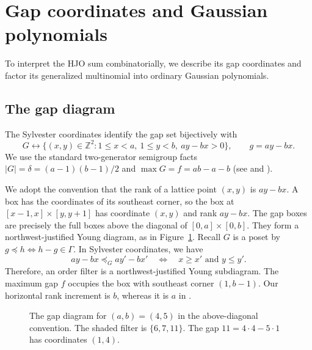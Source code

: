 \documentclass[12pt,reqno]{amsart}
\numberwithin{equation}{section}
\theoremstyle{definition}
\theoremstyle{remark}
\theoremstyle{plain}
\newcommand{\ZZ}{\mathbb Z}
\begin{document}
\section{Gap coordinates and Gaussian polynomials}\label{sec:definitions}

To interpret the HJO sum combinatorially, we describe its gap coordinates
and factor its generalized multinomial into ordinary Gaussian polynomials.



\subsection{The gap diagram}
The Sylvester coordinates identify the gap set bijectively with
\begin{equation}\label{eq:sylvester}
 G\longleftrightarrow
 \{(x,y)\in\ZZ^2:1\le x<a,\ 1\le y<b,\ ay-bx>0\},
 \qquad g=ay-bx.
\end{equation}
We use the standard two-generator semigroup facts
$|G|=\delta=(a-1)(b-1)/2$ and $\max G=f=ab-a-b$ (see \cite[Section~1.2]{Huang} and \cite[Chapter~2]{RA}).

We adopt the convention that the rank of a lattice point $(x,y)$ is $ay-bx$.
A box has the coordinates of its southeast corner, so the box at $[x-1,x]\times[y,y+1]$ has coordinate $(x,y)$ and rank $ay-bx$.
The gap boxes are precisely the full boxes above the diagonal of
$[0,a]\times[0,b]$.  They form a northwest-justified Young diagram, 
as in Figure~\ref{fig:younggap}.
Recall $G$ is a poset by $g\preceq h\iff h-g\in \Gamma$. In Sylvester coordinates, we have
\[
 ay-bx\preceq_G ay'-bx'
       \quad\Longleftrightarrow\quad x\ge x'\text{ and }y\le y'.
\]
Therefore, an order filter is a northwest-justified Young subdiagram.
The maximum gap $f$ occupies the box with southeast corner $(1,b-1)$.
Our horizontal rank increment is $b$, whereas it is $a$ in
\cite[Section~1.2]{Huang}.

\begin{figure}[!htbp]
\centering
{}
\caption{The gap diagram for $(a,b)=(4,5)$ in the above-diagonal
convention.  The shaded filter is $\{6,7,11\}$.
The gap $11=4\cdot4-5\cdot1$ has coordinates $(1,4)$.}
\label{fig:younggap}
\end{figure}
\end{document}
